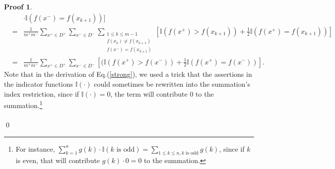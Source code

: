 \documentclass[a4paper,UTF8]{article}
\theoremstyle{definition}
\newtheorem*{prove}{Proof}
\begin{document}
\begin{prove}
\begin{eqnarray}
&&\cdot\mathbb{I}(f(x^-)=f(x_{k+1}))]\nonumber\\
&=& \frac{1}{m^+m^-}\sum_{x^+\in D^+}\sum_{x^-\in D^-}\sum_{\substack{1\leq k\leq m-1\\ f(x_k)\neq f(x_{k+1}) \\ f(x^-)=f(x_{k+1})}}[\mathbb{I}(f(x^+)> f(x_{k+1}))+\frac{1}{2}\mathbb{I}(f(x^+)=f(x_{k+1}))]\nonumber\\
&=& \frac{1}{m^+m^-}\sum_{x^+\in D^+}\sum_{x^-\in D^-}[(\mathbb{I}(f(x^+)> f(x^-))+\frac{1}{2}\mathbb{I}(f(x^+)=f(x^-))].
\end{eqnarray}
Note that in the derivation of Eq.(\ref{strong}), we used a trick that the assertions in the indicator functions $\mathbb{I}(\cdot)$ could sometimes be rewritten into the summation's index restriction, since if $\mathbb{I}(\cdot)=0$, the term will contribute 0 to the summation.\footnote{For instance, $\sum_{k=1}^{n}g(k)\cdot\mathbb{I}(k\text{ is odd})=\sum_{1\leq k\leq n, k\text{ is odd}}g(k)$, since if $k$ is even, that will contribute $g(k)\cdot 0=0$ to the summation.}
~\\
~\\
\qed
\end{prove}
\end{document}
